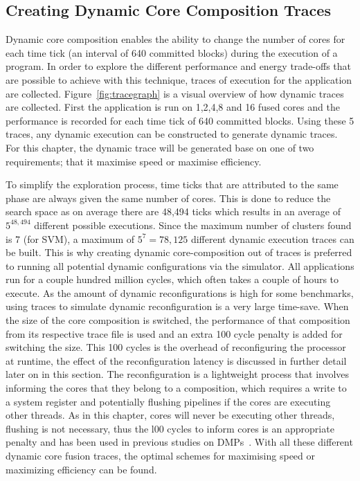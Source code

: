 \subsection{Creating Dynamic Core Composition Traces}

Dynamic core composition enables the ability to change the number of cores for each time tick (an interval of 640 committed blocks) during the execution of a program.
In order to explore the different performance and energy trade-offs that are possible to achieve with this technique, traces of execution for the application are collected.
Figure~\ref{fig:tracegraph} is a visual overview of how dynamic traces are collected.
First the application is run on 1,2,4,8 and 16 fused cores and the performance is recorded for each time tick of 640 committed blocks.
Using these 5 traces, any dynamic execution can be constructed to generate dynamic traces.
For this chapter, the dynamic trace will be generated base on one of two requirements; that it maximise speed or maximise efficiency.

To simplify the exploration process, time ticks that are attributed to the same phase are always given the same number of cores.
This is done to reduce the search space as on average there are 48,494 ticks which results in an average of $5^{48,494}$ different possible executions.
Since the maximum number of clusters found is 7 (for SVM), a maximum of $5^{7} = 78,125$ different dynamic execution traces can be built.
This is why creating dynamic core-composition out of traces is preferred to running all potential dynamic configurations via the simulator.
All applications run for a couple hundred million cycles, which often takes a couple of hours to execute.
As the amount of dynamic reconfigurations is high for some benchmarks, using traces to simulate dynamic reconfiguration is a very large time-save.
When the size of the core composition is switched, the performance of that composition from its respective trace file is used and an extra 100 cycle penalty is added for switching the size.
This 100 cycles is the overhead of reconfiguring the processor at runtime, the effect of the reconfiguration latency is discussed in further detail later on in this section.
The reconfiguration is a lightweight process that involves informing the cores that they belong to a composition, which requires a write to a system register and potentially flushing pipelines if the cores are executing other threads.
As in this chapter, cores will never be executing other threads, flushing is not necessary, thus the l00 cycles to inform cores is an appropriate penalty and has been used in previous studies on DMPs~\cite{pricopi2012bahurupi}.
With all these different dynamic core fusion traces, the optimal schemes for maximising speed or maximizing efficiency can be found.

